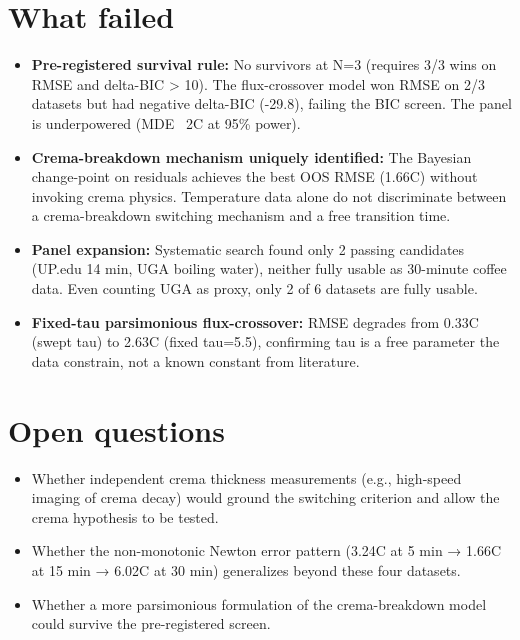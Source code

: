 \documentclass{article}
\begin{document}
\section{What failed}
\begin{itemize}
    \item \textbf{Pre-registered survival rule:} No survivors at N=3 (requires 3/3 wins on RMSE and delta-BIC > 10). The flux-crossover model won RMSE on 2/3 datasets but had negative delta-BIC (-29.8), failing the BIC screen. The panel is underpowered (MDE ~2\textdegree C at 95\% power).
    \item \textbf{Crema-breakdown mechanism uniquely identified:} The Bayesian change-point on residuals achieves the best OOS RMSE (1.66\textdegree C) without invoking crema physics. Temperature data alone do not discriminate between a crema-breakdown switching mechanism and a free transition time.
    \item \textbf{Panel expansion:} Systematic search found only 2 passing candidates (UP.edu 14 min, UGA boiling water), neither fully usable as 30-minute coffee data. Even counting UGA as proxy, only 2 of 6 datasets are fully usable.
    \item \textbf{Fixed-tau parsimonious flux-crossover:} RMSE degrades from 0.33\textdegree C (swept tau) to 2.63\textdegree C (fixed tau=5.5), confirming tau is a free parameter the data constrain, not a known constant from literature.
\end{itemize}

\section{Open questions}
\begin{itemize}
    \item Whether independent crema thickness measurements (e.g., high-speed imaging of crema decay) would ground the switching criterion and allow the crema hypothesis to be tested.
    \item Whether the non-monotonic Newton error pattern (3.24\textdegree C at 5 min → 1.66\textdegree C at 15 min → 6.02\textdegree C at 30 min) generalizes beyond these four datasets.
    \item Whether a more parsimonious formulation of the crema-breakdown model could survive the pre-registered screen.
\end{itemize}
\end{document}
